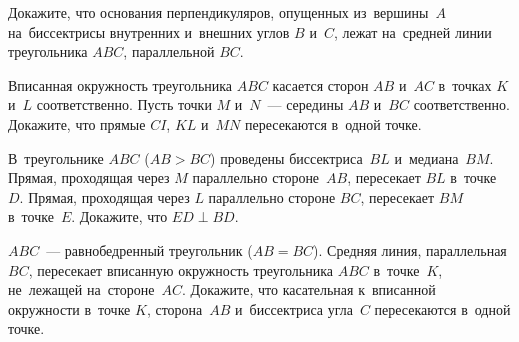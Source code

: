 \begin{problems}

\item
Докажите, что основания перпендикуляров, опущенных из~вершины~$A$
на~биссектрисы внутренних и~внешних углов $B$ и~$C$, лежат на~средней линии
треугольника $ABC$, параллельной $BC$.

\item
Вписанная окружность треугольника $ABC$ касается сторон $AB$ и~$AC$ в~точках
$K$ и~$L$ соответственно.
Пусть точки $M$ и~$N$~--- середины $AB$ и~$BC$ соответственно.
Докажите, что прямые $CI$, $KL$ и~$MN$ пересекаются в~одной точке.

\item
В~треугольнике $ABC$ ($AB > BC$) проведены биссектриса~$BL$ и~медиана~$BM$.
Прямая, проходящая через $M$ параллельно стороне~$AB$, пересекает $BL$
в~точке~$D$.
Прямая, проходящая через $L$ параллельно стороне $BC$, пересекает $BM$
в~точке~$E$.
Докажите, что $ED \perp BD$.

\item
$ABC$~--- равнобедренный треугольник ($AB = BC$).
Средняя линия, параллельная $BC$, пересекает вписанную окружность треугольника
$ABC$ в~точке~$K$, не~лежащей на~стороне~$AC$.
Докажите, что касательная к~вписанной окружности в~точке $K$, сторона~$AB$
и~биссектриса угла~$C$ пересекаются в~одной точке.

\end{problems}

